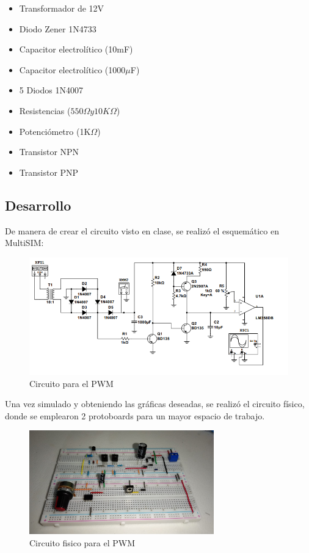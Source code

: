 \begin{itemize}
    \item Transformador de 12V
    \item Diodo Zener 1N4733
    \item Capacitor electrolítico (10mF)
    \item Capacitor electrolítico (1000$\mu$F)
    \item 5 Diodos 1N4007
    \item Resistencias ($550\Omega y 10K\Omega$)
    \item Potenciómetro (1K$\Omega$)
    \item Transistor NPN
    \item Transistor PNP
\end{itemize}

\subsection{Desarrollo}

De manera de crear el circuito visto en clase, se realizó el esquemático en MultiSIM:

\begin{figure}
    \centering
    \includegraphics[width=12cm]{media/Circuito.png}
    \caption{Circuito para el PWM}
\end{figure}

Una vez simulado y obteniendo las gráficas deseadas, se realizó el circuito físico, donde se emplearon 2 protoboards para un mayor espacio de trabajo.

\begin{figure}
    \centering
    \includegraphics[width=8cm]{media/Circuito3.jpg}
    \caption{Circuito fisico para el PWM}
\end{figure}

